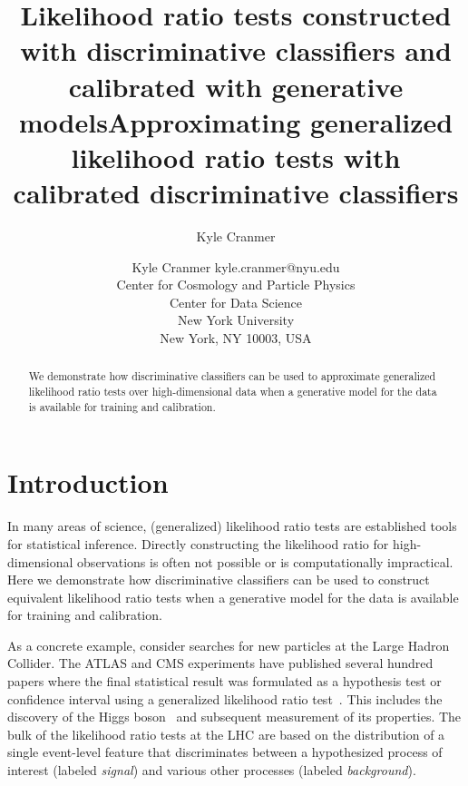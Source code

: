 \documentclass[11pt, oneside]{article}   	%
\title{Likelihood ratio tests constructed with discriminative classifiers and calibrated with generative models}
\title{Approximating generalized likelihood ratio tests with calibrated discriminative classifiers}
\author{Kyle Cranmer}
\begin{document}
\author{\name Kyle Cranmer \email kyle.cranmer@nyu.edu \\
       \addr Center for Cosmology and Particle Physics\\
       Center for Data Science\\
       New York University \\
       New York, NY 10003, USA
}

\editor{}

\maketitle

\begin{abstract}%
We demonstrate how discriminative classifiers can be used to approximate 
generalized likelihood ratio tests over high-dimensional data when a generative model 
for the data is available for training and calibration.  
\end{abstract}
%




\maketitle

\section{Introduction}


In many areas of science, (generalized) likelihood ratio tests  are established tools for statistical inference. 
Directly constructing the likelihood ratio for high-dimensional observations 
is often not possible or is computationally impractical. Here we demonstrate how 
discriminative classifiers can be used to construct equivalent likelihood ratio tests when 
a generative model for the data is available for training and calibration.  

As a concrete example, consider searches for new particles at the Large Hadron Collider. 
The ATLAS and CMS experiments have published several hundred papers where the 
final statistical result was formulated as a hypothesis test or confidence interval 
using a generalized likelihood ratio test~\citep{Cowan:2010js}. This includes
the discovery of the Higgs boson~\citep{Aad:2012tfa,Chatrchyan:2012ufa} and 
subsequent measurement of its properties.  
The bulk of the likelihood ratio tests at the LHC are based on the distribution of a single event-level feature
that discriminates between a hypothesized process of interest (labeled \textit{signal}) and various other processes 
(labeled \textit{background}).
\end{document}
